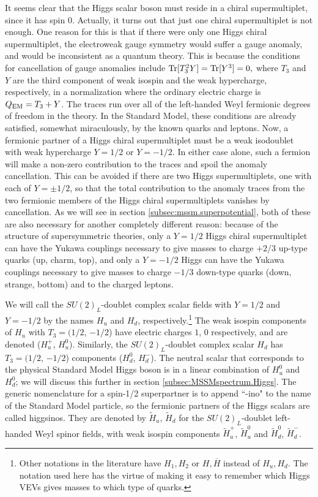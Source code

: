 \documentclass[12pt]{article}
\def\sbar{\overline}
\def\stilde{\widetilde}
\begin{document}
It seems clear that the Higgs scalar boson must reside in a chiral
supermultiplet, since it has spin 0. Actually, it turns out that just one
chiral supermultiplet is not enough. One reason for this is that
if there were only one Higgs chiral supermultiplet, the electroweak gauge
symmetry would suffer a gauge anomaly, and would be inconsistent as a
quantum theory. This is because the conditions for cancellation of gauge
anomalies include $ {\rm Tr}[T_3^2 Y] = {\rm Tr}[Y^3] = 0, $ where $T_3$
and $Y$ are the third component of weak isospin and the weak hypercharge,
respectively, in a normalization where the ordinary electric charge is
$Q_{\rm EM} = T_3 + Y$. The traces run over all of the left-handed Weyl
fermionic degrees of freedom in the theory. In the Standard Model, these
conditions are already satisfied, somewhat miraculously, by the known
quarks and leptons. Now, a fermionic partner of a Higgs chiral
supermultiplet must be a weak isodoublet with weak hypercharge $Y=1/2$ or
$Y=-1/2$. In either case alone, such a fermion will make a non-zero
contribution to the traces and spoil the anomaly cancellation. This can be
avoided if there are two Higgs supermultiplets, one with each of $Y=\pm
1/2$, so that the total contribution to the anomaly traces from the two
fermionic members of the Higgs chiral supermultiplets vanishes by
cancellation. As we will see in section \ref{subsec:mssm.superpotential},
both of these are also necessary for another completely different reason:
because of the structure of supersymmetric theories, only a $Y=1/2$ Higgs
chiral supermultiplet can have the Yukawa couplings necessary to give
masses to charge $+2/3$ up-type quarks (up, charm, top), and only a
$Y=-1/2$ Higgs can have the Yukawa couplings necessary to give masses to
charge $-1/3$ down-type quarks (down, strange, bottom) and to the charged
leptons. 

We will call the $SU(2)_L$-doublet complex scalar fields with
$Y=1/2$ and $Y=-1/2$ by the names $H_u$ and $H_d$,
respectively.\footnote{Other notations in the literature have
$H_1, H_2$ or $H,\sbar H$ instead of $H_u, H_d$. The notation used here
has the virtue of making it easy to remember which Higgs VEVs
gives masses to which type of quarks.} The weak isospin components of
$H_u$ with $T_3=(1/2$, $-1/2$) have electric charges $1$, $0$
respectively, and are denoted ($H_u^+$, $H_u^0$). Similarly, the
$SU(2)_L$-doublet complex scalar $H_d$ has $T_3=(1/2$, $-1/2$) components
($H_d^0$, $H_d^-$). The neutral scalar that corresponds to the physical
Standard Model Higgs boson is in a linear combination of $H_u^0$ and
$H_d^0$; we will discuss this further in section
\ref{subsec:MSSMspectrum.Higgs}.  The generic nomenclature for a spin-1/2
superpartner is to append ``-ino" to the name of the Standard Model
particle, so the fermionic partners of the Higgs scalars are called
higgsinos. They are denoted by $\stilde H_u$, $\stilde H_d$ for the
$SU(2)_L$-doublet left-handed Weyl spinor fields, with weak isospin
components $\stilde H_u^+$, $\stilde H_u^0$ and $\stilde H_d^0$, $\stilde
H_d^-$. 
\end{document}

